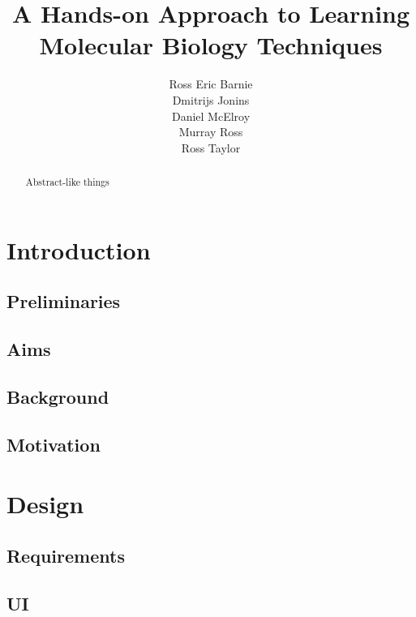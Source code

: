\documentclass{l3proj}
\title{A Hands-on Approach to Learning Molecular Biology Techniques}
\author{
  Ross Eric Barnie \\
  Dmitrijs Jonins \\
  Daniel McElroy \\
  Murray Ross \\
  Ross Taylor
}
\date{}
\begin{document}
\maketitle
\begin{abstract}

Abstract-like things

\end{abstract}
\educationalconsent
\tableofcontents

\chapter{Introduction}
\label{intro}

\section{Preliminaries}
\label{intro:prelims}


\section{Aims}
\label{intro:aims}


\section{Background}
\label{intro:backgroud}

\section{Motivation}
\label{intro:motiv}


\chapter{Design}
\label{design}

\section{Requirements}
\label{design:reqs}

\section{UI}
\label{design:ui}

\end{document}
